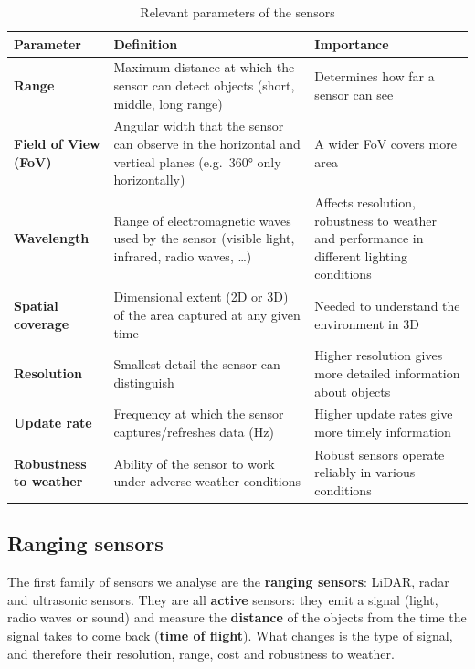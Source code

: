 \begin{table}[H]
    \centering
    \begin{tabular}{|p{2.6cm}|p{7cm}|p{6cm}|}
        \hline
        \textbf{Parameter} & \textbf{Definition} & \textbf{Importance} \\
        \hline
        \textbf{Range} & Maximum distance at which the sensor can detect objects (short, middle, long range) & Determines how far a sensor can see \\
        \hline
        \textbf{Field of View (FoV)} & Angular width that the sensor can observe in the horizontal and vertical planes (e.g.\ 360° only horizontally) & A wider FoV covers more area \\
        \hline
        \textbf{Wavelength} & Range of electromagnetic waves used by the sensor (visible light, infrared, radio waves, \dots) & Affects resolution, robustness to weather and performance in different lighting conditions \\
        \hline
        \textbf{Spatial coverage} & Dimensional extent (2D or 3D) of the area captured at any given time & Needed to understand the environment in 3D \\
        \hline
        \textbf{Resolution} & Smallest detail the sensor can distinguish & Higher resolution gives more detailed information about objects \\
        \hline
        \textbf{Update rate} & Frequency at which the sensor captures/refreshes data (Hz) & Higher update rates give more timely information \\
        \hline
        \textbf{Robustness to weather} & Ability of the sensor to work under adverse weather conditions & Robust sensors operate reliably in various conditions \\
        \hline
    \end{tabular}
    \caption{Relevant parameters of the sensors}
\end{table}

\subsection{Ranging sensors}
The first family of sensors we analyse are the \textbf{ranging sensors}: LiDAR, radar and ultrasonic sensors. They are all \textbf{active} sensors: they emit a signal (light, radio waves or sound) and measure the \textbf{distance} of the objects from the time the signal takes to come back (\textbf{time of flight}). What changes is the type of signal, and therefore their resolution, range, cost and robustness to weather.

